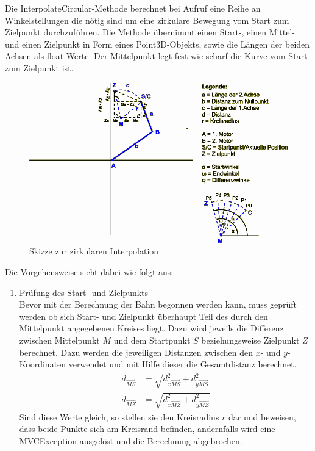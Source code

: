 \begin{itemize}
Die InterpolateCircular-Methode berechnet bei Aufruf eine Reihe an Winkelstellungen die nötig sind um eine zirkulare Bewegung vom Start zum Zielpunkt durchzuführen. Die Methode übernimmt einen Start-, einen Mittel- und einen Zielpunkt in Form eines Point3D-Objekts, sowie die Längen der beiden Achsen als float-Werte. Der Mittelpunkt legt fest wie scharf die Kurve vom Start- zum Zielpunkt ist.\\
\begin{figure}[H]
  \centering
  \begin{minipage}[t]{14 cm}
  	\centering
  	\includegraphics[width=12cm]{images/Zirkularinterpolation} 
    \caption{Skizze zur zirkularen Interpolation}
  \end{minipage}
\end{figure}
Die Vorgehensweise sieht dabei wie folgt aus:
\begin{enumerate}
\item Prüfung des Start- und Zielpunkts\\
Bevor mit der Berechnung der Bahn begonnen werden kann, muss geprüft werden ob sich Start- und Zielpunkt überhaupt Teil des durch den Mittelpunkt angegebenen Kreises liegt. Dazu wird jeweils die Differenz zwischen Mittelpunkt $M$ und dem Startpunkt $S$ beziehungsweise Zielpunkt $Z$ berechnet. Dazu werden die jeweiligen Distanzen zwischen den $x$- und $y$-Koordinaten verwendet und mit Hilfe dieser die Gesamtdistanz berechnet.
\begin{align*}
d_{\overrightarrow{MS}} & = \sqrt{d_{x\overrightarrow{MS}}^2 + d_{y\overrightarrow{MS}}^2}\\
d_{\overrightarrow{MZ}} & = \sqrt{d_{x\overrightarrow{MZ}}^2 + d_{y\overrightarrow{MZ}}^2}
\end{align*}
Sind diese Werte gleich, so stellen sie den Kreisradius $r$ dar und beweisen, dass beide Punkte sich am Kreisrand befinden, andernfalls wird eine MVCException ausgelöst und die Berechnung abgebrochen. 

\end{enumerate}
\end{itemize}
